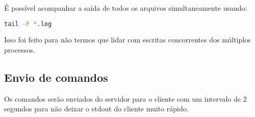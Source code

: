 \documentclass[12pt,a4paper]{report}
\begin{document}
É possível acompanhar a saída de todos os arquivos simultaneamente usando:
\begin{lstlisting}[language=bash]
  tail -F *.log
\end{lstlisting}

Isso foi feito para não termos que lidar com escritas concorrentes dos múltiplos processos.

\subsection{Envio de comandos}

Os comandos serão enviados do servidor para o cliente com um intervalo de 2 segundos para não deixar o stdout do cliente muito rápido.
\end{document}
